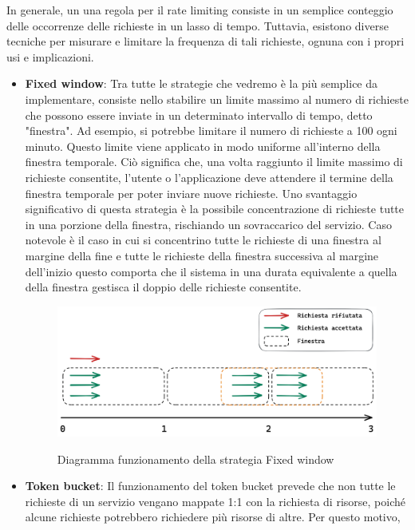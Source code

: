 In generale, un una regola per il rate limiting consiste in un semplice conteggio delle occorrenze delle richieste in un
lasso di tempo. Tuttavia, esistono diverse tecniche per misurare e limitare la frequenza di tali richieste, ognuna con i
propri usi e implicazioni.
\begin{itemize}
    \item \textbf{Fixed window}: Tra tutte le strategie che vedremo è la più semplice da implementare, consiste nello stabilire un
    limite massimo al numero di richieste che possono essere inviate in un determinato intervallo di tempo, detto
    "finestra". Ad esempio, si potrebbe limitare il numero di richieste a 100 ogni minuto. Questo limite viene applicato in
    modo uniforme all'interno della finestra temporale. Ciò significa che, una volta raggiunto il limite massimo di
    richieste consentite, l'utente o l'applicazione deve attendere il termine della finestra temporale per poter inviare
    nuove richieste. Uno svantaggio significativo di questa strategia è la possibile concentrazione di richieste tutte in
    una porzione della finestra, rischiando un sovraccarico del servizio. Caso notevole è il caso in cui si concentrino tutte
    le richieste di una finestra al margine della fine e tutte le richieste della finestra successiva al margine dell’inizio
    questo comporta che il sistema in una durata equivalente a quella della finestra gestisca il doppio delle richieste
    consentite.
    \begin{figure}[H]
        \centering
        \includegraphics[width=13cm]{./chapters/1.state-of-art/images/1.fixed_window.png}
        \label{fig:fixed-window}
        \captionsetup{justification=centering}
        \caption{Diagramma funzionamento della strategia Fixed window}
    \end{figure}
    \item \textbf{Token bucket}: Il funzionamento del token bucket prevede che non tutte le richieste di un servizio vengano mappate
    1:1 con la richiesta di risorse, poiché alcune richieste potrebbero richiedere più risorse di altre. Per questo motivo,

\end{itemize}
